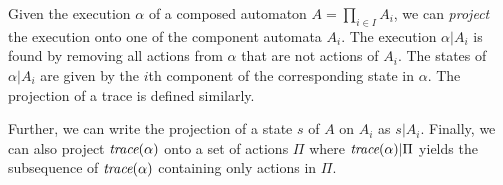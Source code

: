 Given the execution $\alpha$ of a composed automaton $A = \prod_{i \in I} A_i$,
we can \textit{project} the execution onto one of the component automata $A_i$.
The execution $\alpha|A_i$ is found by removing all actions from
$\alpha$ that are not actions of $A_i$. The states of $\alpha|A_i$ are
given by the $i$th component of the corresponding state in $\alpha$. The
projection of a trace is defined similarly.

Further, we can write the projection of a state $s$ of $A$ on $A_i$ as $s|A_i$.  Finally, we can also project $\operatorname*{\textit{trace}}(\alpha)$ onto a set of actions $\Pi$ where $\operatorname*{\textit{trace}}(\alpha)|\Pi$ yields the subsequence of $\operatorname*{\textit{trace}}(\alpha)$ containing only actions in $\Pi$.

